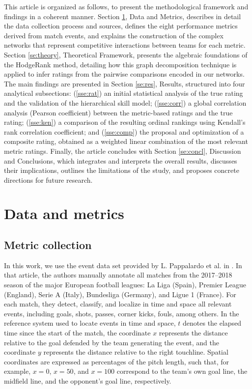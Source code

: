 \documentclass[preprint,12pt]{elsarticle}
\begin{document}
This article is organized as follows, to present the methodological framework and findings in a coherent manner. Section \ref{se:dym},  Data and Metrics, describes in detail the data collection process and sources, defines the eight performance metrics derived from match events, and explains the construction of the complex networks that represent competitive interactions between teams for each metric. Section \ref{se:theory}, Theoretical Framework, presents the algebraic foundations of the HodgeRank method, detailing how this graph decomposition technique is applied to infer ratings from the pairwise comparisons encoded in our networks. The main findings are presented in Section \ref{se:res}, Results, structured into four analytical subsections: (\ref{sse:rat}) an initial statistical analysis of the true rating and the validation of the hierarchical skill model; (\ref{sse:corr}) a global correlation analysis (Pearson coefficient) between the metric-based ratings and the true rating; (\ref{sse:ken}) a comparison of the resulting ordinal rankings using Kendall’s rank correlation coefficient; and (\ref{sse:comp}) the proposal and optimization of a composite rating, obtained as a weighted linear combination of the most relevant metric ratings. Finally, the article concludes with Section \ref{se:concl}, Discussion and Conclusions, which integrates and interprets the overall results, discusses their implications, outlines the limitations of the study, and proposes concrete directions for future research.

\section{Data and metrics}
\label{se:dym}

\subsection{Metric collection}
\label{se:metricas}

In this work, we use the event data set provided by L. Pappalardo et al. in \cite{pappalardo2019public}.  
In that article, the authors manually annotate all matches from the 2017--2018 season of the major European football leagues: La Liga (Spain), Premier League (England), Serie A (Italy), Bundesliga (Germany), and Ligue 1 (France). For each match, they detect, classify, and localize in time and space all relevant events, including goals, shots, passes, corner kicks, fouls, among others.  
%
In the reference system used to locate events in time and space, $t$ denotes the elapsed time since the start of the match, the coordinate $x$ represents the distance relative to the goal defended by the team generating the event, and the coordinate $y$ represents the distance relative to the right touchline. Spatial coordinates are expressed as percentages of the pitch length, such that, for example, $x=0$, $x=50$, and $x=100$ correspond to the team’s own goal line, the midfield line, and the opponent’s goal line, respectively.
\end{document}
